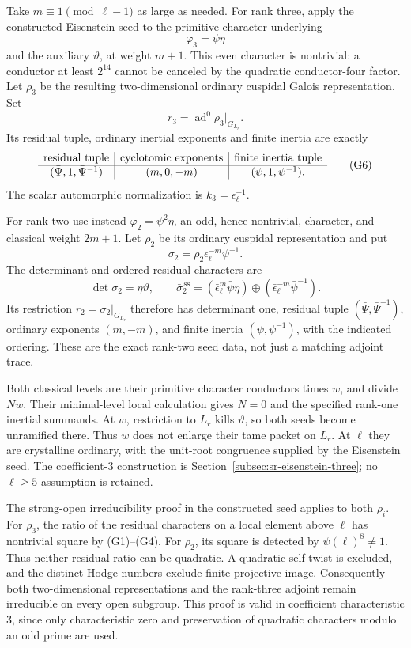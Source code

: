 Take \(m\equiv1\pmod{\ell-1}\) as large as needed.
For rank three, apply the constructed Eisenstein seed
to the primitive character underlying
\[
                         \varphi_3=\psi\eta
\]
and the auxiliary \(\vartheta\), at weight \(m+1\).
This even character is nontrivial: a conductor at least
\(2^{14}\) cannot be canceled by the quadratic
conductor-four factor.
Let \(\rho_3\) be the resulting two-dimensional
ordinary cuspidal Galois representation.
Set
\[
                            r_3=\operatorname{ad}^0\rho_3
                                                    |_{G_{L_r}} .
\]
Its residual tuple, ordinary inertial exponents and
finite inertia are exactly
\[
 \begin{array}{c|c|c}
 \hbox{residual tuple}&\hbox{cyclotomic exponents}&
                                     \hbox{finite inertia tuple}\\ \hline
 (\bar\Psi,1,\bar\Psi^{-1})&(m,0,-m)&(\psi,1,\psi^{-1}) .
 \end{array}
 \tag{G6}
\]
The scalar automorphic normalization is
\(k_3=\epsilon_\ell^{-1}\).

For rank two use instead
\(\varphi_2=\psi^2\eta\), an odd, hence nontrivial,
character, and classical weight \(2m+1\).
Let \(\rho_2\) be its ordinary cuspidal representation
and put
\[
                   \sigma_2=\rho_2\epsilon_\ell^{-m}\psi^{-1}.
\]
The determinant and ordered residual characters are
\[
 \det\sigma_2=\eta\vartheta,\qquad
 \bar\sigma_2^{\,\mathrm{ss}}
       =(\bar\epsilon_\ell^m\bar\psi\eta)
                     \oplus(\bar\epsilon_\ell^{-m}\bar\psi^{-1}).
 \tag{G7}
\]
Its restriction \(r_2=\sigma_2|_{G_{L_r}}\) therefore
has determinant one, residual tuple
\((\bar\Psi,\bar\Psi^{-1})\), ordinary exponents
\((m,-m)\), and finite inertia
\((\psi,\psi^{-1})\), with the indicated ordering.
These are the exact rank-two seed data,
not just a matching adjoint trace.

Both classical levels are their primitive character
conductors times \(w\), and divide \(Nw\).
Their minimal-level local calculation gives \(N=0\)
and the specified rank-one inertial summands.
At \(w\), restriction to \(L_r\) kills
\(\vartheta\), so both seeds become unramified there.
Thus \(w\) does not enlarge their tame packet on \(L_r\).
At \(\ell\) they are crystalline ordinary, with the
unit-root congruence supplied by the Eisenstein seed.
The coefficient-\(3\) construction is
Section~\ref{subsec:sr-eisenstein-three}; no
\(\ell\ge5\) assumption is retained.

The strong-open irreducibility proof in the constructed
seed applies to both \(\rho_i\).
For \(\rho_3\), the ratio of the residual characters
on a local element above \(\ell\) has nontrivial square
by (G1)--(G4).
For \(\rho_2\), its square is detected by
\(\psi(\ell)^8\ne1\).
Thus neither residual ratio can be quadratic.
A quadratic self-twist is excluded, and the distinct
Hodge numbers exclude finite projective image.
Consequently both two-dimensional representations and
the rank-three adjoint remain irreducible on every
open subgroup.
This proof is valid in coefficient characteristic
\(3\), since only characteristic zero and preservation
of quadratic characters modulo an odd prime are used.

